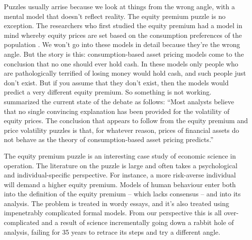 Puzzles usually arrise because we look at things from the wrong angle, with a mental model that doesn't reflect reality. The equity premium puzzle is no exception. The researchers who first studied the equity premium had a model in mind whereby equity prices are set based on the consumption preferences of the population \citep{MehraPrescott1985}. 
We won't go into these models in detail because they're the wrong angle. But the story is this: consumption-based asset pricing models come to the conclusion that no one should ever hold cash. In these models only people who are pathologically terrified of losing money would hold cash, and such people just don't exist. But if you assume that they don't exist, then the models would predict a very different equity premium. So something is not working.
\cite{LeRoy2016} summarized the current state of the debate as follows: ``Most analysts believe that no single convincing explanation has been provided for the volatility of equity prices. The conclusion that appears to follow from the equity premium and price volatility puzzles is that, for whatever reason, prices of financial assets do not behave as the theory of consumption-based asset pricing predicts.''

The equity premium puzzle is an interesting case study of economic science in operation.  The literature on the puzzle is large and often takes a psychological and individual-specific perspective. For instance, a more risk-averse individual will demand a higher equity premium. Models of human behaviour enter both into the definition of the equity premium -- which lacks consensus \citep{Fernandez2009} -- and into its analysis. The problem is treated in wordy essays, and it's also treated using impenetrably complicated formal models. From our perspective this is all over-complicated and a result of science incrementally going down a rabbit hole of analysis, failing for 35 years to retrace its steps and try a different angle.

